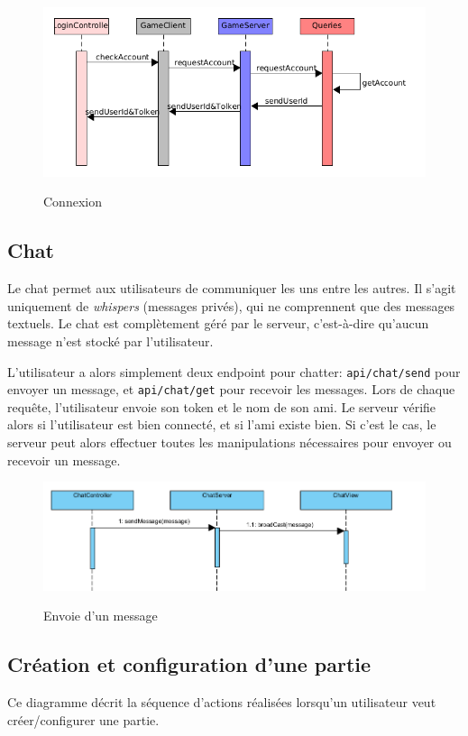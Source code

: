 \documentclass[../design_fonctionnement_sys.tex]{subfiles}
\begin{document}
\begin{figure}[H]
    \centering
    \includegraphics[scale=0.4]{img_design/login_fonctionnement.png}
    \label{fig:seq_match_client}
    \caption{Connexion}
\end{figure}


\subsection{Chat}
Le chat permet aux utilisateurs de communiquer les uns entre les autres. Il s'agit uniquement de \textit{whispers} (messages privés), qui ne comprennent que des messages textuels.
Le chat est complètement géré par le serveur, c'est-à-dire qu'aucun message n'est stocké par l'utilisateur.

L'utilisateur a alors simplement deux endpoint pour chatter: \texttt{api/chat/send} pour envoyer un message, et \texttt{api/chat/get} pour recevoir les messages.
Lors de chaque requête, l'utilisateur envoie son token et le nom de son ami. Le serveur vérifie alors si l'utilisateur est bien connecté, et si l'ami existe bien.
Si c'est le cas, le serveur peut alors effectuer toutes les manipulations nécessaires pour envoyer ou recevoir un message.

\begin{figure}[H]
    \centering
    \includegraphics[scale=0.3]{img_design/Chat_DS.png}
    \label{fig:seq_match_client}
    \caption{Envoie d'un message}
\end{figure}

\subsection{Création et configuration d'une partie}
Ce diagramme décrit la séquence d'actions réalisées lorsqu'un utilisateur veut créer/configurer une partie.
\end{document}
